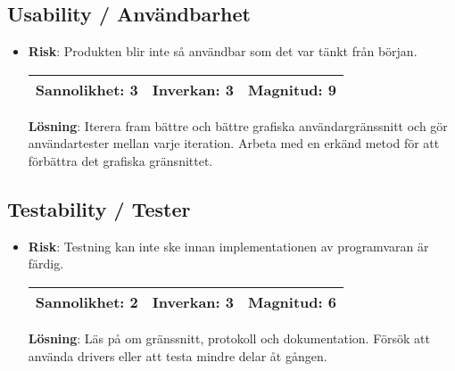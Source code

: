 \subsection{Usability / Användbarhet}
\begin{itemize}
\item \textbf{Risk}: Produkten blir inte så användbar som det var tänkt från början.

\begin{tabular}{ | l | l | l |}
	\hline
	Sannolikhet: 3 & Inverkan: 3 & Magnitud: 9 \\ \hline
\end{tabular}

\textbf{Lösning}: Iterera fram bättre och bättre grafiska användargränssnitt och gör användartester mellan varje iteration. Arbeta med en erkänd metod för att förbättra det grafiska gränsnittet.
\end{itemize}

\subsection{Testability / Tester}
\begin{itemize}
\item \textbf{Risk}: Testning kan inte ske innan implementationen av programvaran är färdig.

\begin{tabular}{ | l | l | l |}
	\hline
	Sannolikhet: 2 & Inverkan: 3 & Magnitud: 6 \\ \hline
\end{tabular}

\textbf{Lösning}: Läs på om gränssnitt, protokoll och dokumentation. Försök att använda drivers eller att testa mindre delar åt gången.
\end{itemize}

